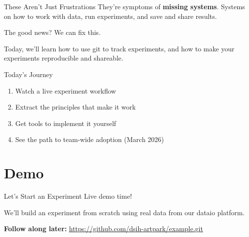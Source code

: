 \documentclass{beamer}
\begin{document}
\begin{frame}{These Aren't Just Frustrations}
\Large
They're symptoms of \textbf{missing systems}. Systems on how to work with data, run experiments, and save and share results.

\vspace{2em}

\normalsize
The good news? We can fix this.

\vspace{2em}

\normalsize
Today, we'll learn how to use git to track experiments, and how to make your experiments reproducible and shareable.
\end{frame}

\begin{frame}{Today's Journey}
\begin{enumerate}
    \item Watch a live experiment workflow
    \item Extract the principles that make it work
    \item Get tools to implement it yourself
    \item See the path to team-wide adoption (March 2026)
\end{enumerate}
\end{frame}

\section{Demo}

\begin{frame}[fragile]{Let's Start an Experiment}
    \Large
    Live demo time!
    
    \vspace{1em}
    \normalsize
    We'll build an experiment from scratch using real data from our dataio platform.
    
    \vspace{1.5em}
    \textbf{Follow along later:}
    \url{https://github.com/dsih-artpark/example.git}
    \end{frame}
\end{document}
